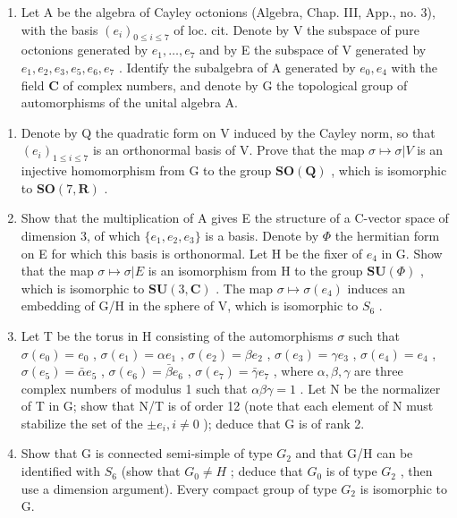\begin{enumerate}
\def\labelenumi{\arabic{enumi})}
\setcounter{enumi}{6}
\tightlist
\item
  Let A be the algebra of Cayley octonions (Algebra, Chap. III, App., no. 3), with the basis \((e_i)_{0\leq i\leq 7}\) of loc. cit. Denote by V the subspace of pure octonions generated by \(e_1,\ldots ,e_7\) and by E the subspace of V generated by \(e_1,e_2,e_3,e_5,e_6,e_7\) . Identify the subalgebra of A generated by \(e_0,e_4\) with the field \(\mathbf{C}\) of complex numbers, and denote by G the topological group of automorphisms of the unital algebra A.
\end{enumerate}

\begin{enumerate}
\def\labelenumi{\alph{enumi})}
\item
  Denote by Q the quadratic form on V induced by the Cayley norm, so that \((e_{i})_{1\leq i\leq7}\) is an orthonormal basis of V. Prove that the map \(\sigma\mapsto\sigma|V\) is an injective homomorphism from G to the group \(\mathbf{SO}(\mathbf{Q})\) , which is isomorphic to \(\mathbf{SO}(7,\mathbf{R})\) .
\item
  Show that the multiplication of A gives E the structure of a C-vector space of dimension 3, of which \(\{e_{1}, e_{2}, e_{3}\}\) is a basis. Denote by \(\Phi\) the hermitian form on E for which this basis is orthonormal. Let H be the fixer of \(e_{4}\) in G. Show that the map \(\sigma \mapsto \sigma|E\) is an isomorphism from H to the group \(\mathbf{SU}(\Phi)\) , which is isomorphic to \(\mathbf{SU}(3, \mathbf{C})\) . The map \(\sigma \mapsto \sigma(e_{4})\) induces an embedding of G/H in the sphere of V, which is isomorphic to \(S_{6}\) .
\item
  Let T be the torus in H consisting of the automorphisms \(\sigma\) such that \(\sigma(e_{0}) = e_{0}\) , \(\sigma(e_{1}) = \alpha e_{1}\) , \(\sigma(e_{2}) = \beta e_{2}\) , \(\sigma(e_{3}) = \gamma e_{3}\) , \(\sigma(e_{4}) = e_{4}\) , \(\sigma(e_{5}) = \bar{\alpha} e_{5}\) , \(\sigma(e_{6}) = \bar{\beta} e_{6}\) , \(\sigma(e_{7}) = \bar{\gamma} e_{7}\) , where \(\alpha, \beta, \gamma\) are three complex numbers of modulus 1 such that \(\alpha\beta\gamma = 1\) . Let N be the normalizer of T in G; show that N/T is of order 12 (note that each element of N must stabilize the set of the \(\pm e_{i}, i \neq 0\) ); deduce that G is of rank 2.
\item
  Show that G is connected semi-simple of type \(G_{2}\) and that G/H can be identified with \(S_{6}\) (show that \(G_{0} \neq H\) ; deduce that \(G_{0}\) is of type \(G_{2}\) , then use a dimension argument). Every compact group of type \(G_{2}\) is isomorphic to G.
\end{enumerate}

